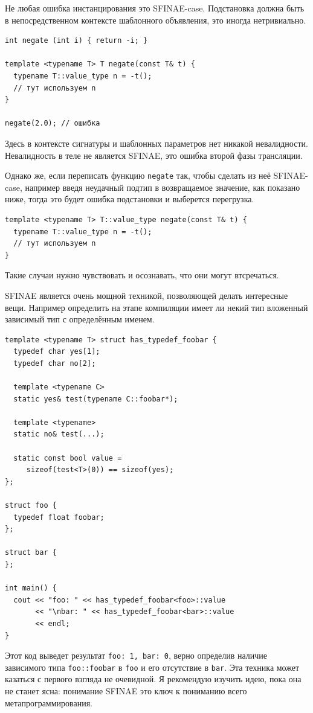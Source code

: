 \documentclass[a4paper,12pt,oneside]{book}
\begin{document}
Не любая ошибка инстанцирования это SFINAE-case. Подстановка должна быть в непосредственном контексте шаблонного объявления, это иногда нетривиально.

\begin{lstlisting}
int negate (int i) { return -i; }

template <typename T> T negate(const T& t) {
  typename T::value_type n = -t();
  // тут используем n
} 

negate(2.0); // ошибка
\end{lstlisting}

Здесь в контексте сигнатуры и шаблонных параметров нет никакой невалидности. Невалидность в теле не является SFINAE, это ошибка второй фазы трансляции.

Однако же, если переписать функцию \lstinline!negate! так, чтобы сделать из неё SFINAE-case, например введя неудачный подтип в возвращаемое значение, как показано ниже, тогда это будет ошибка подстановки и выберется перегрузка.

\begin{lstlisting}
template <typename T> T::value_type negate(const T& t) {
  typename T::value_type n = -t();
  // тут используем n
} 
\end{lstlisting}

Такие случаи нужно чувствовать и осознавать, что они могут втсречаться.

SFINAE является очень мощной техникой, позволяющей делать интересные вещи. Например определить на этапе компиляции имеет ли некий тип вложенный зависимый тип с определённым именем.

\begin{lstlisting}
template <typename T> struct has_typedef_foobar {
  typedef char yes[1];
  typedef char no[2];
 
  template <typename C>
  static yes& test(typename C::foobar*);
 
  template <typename>
  static no& test(...);
 
  static const bool value = 
     sizeof(test<T>(0)) == sizeof(yes);
};

struct foo {    
  typedef float foobar;
};

struct bar {    
};

int main() {
  cout << "foo: " << has_typedef_foobar<foo>::value
       << "\nbar: " << has_typedef_foobar<bar>::value
       << endl;
}
\end{lstlisting}

Этот код выведет результат \lstinline!foo: 1, bar: 0!, верно определив наличие зависимого типа \lstinline!foo::foobar! в \lstinline!foo! и его отсутствие в \lstinline!bar!. Эта техника может казаться с первого взгляда не очевидной. Я рекомендую изучить идею, пока она не станет ясна: понимание SFINAE это ключ к пониманию всего метапрограммирования.
\end{document}
